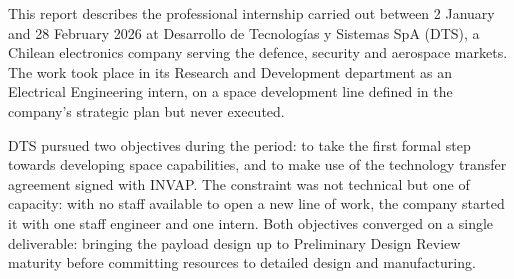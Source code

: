 %
%
%




This report describes the professional internship carried out between 2 January
and 28 February 2026 at Desarrollo de Tecnologías y Sistemas SpA (DTS), a
Chilean electronics company serving the defence, security and aerospace markets.
The work took place in its Research and Development department as an Electrical
Engineering intern, on a space development line defined in the company's
strategic plan but never executed.

DTS pursued two objectives during the period: to take the first formal step
towards developing space capabilities, and to make use of the technology
transfer agreement signed with INVAP. The constraint was not technical but one
of capacity: with no staff available to open a new line of work, the company
started it with one staff engineer and one intern. Both objectives converged on a single
deliverable: bringing the payload design up to Preliminary Design Review
maturity before committing resources to detailed design and manufacturing.

